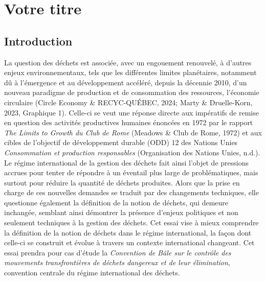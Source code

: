 \documentclass[12pt]{ulaval}
\date{Décembre 2024}
\begin{document}
  \maketitle

\frontmatter %
\pagestyle{plain} %
\setcounter{page}{2}



% 
  \hypersetup{linkcolor=black}
   \setcounter{tocdepth}{2}
  \tableofcontents

  \listoftables

  \listoffigures


% 
\mainmatter %
\pagestyle{fancyplain} %

\doublespace

\chapter{Votre titre}\label{votre-titre}

\section{Introduction}\label{introduction}

La question des déchets est associée, avec un engouement renouvelé, à d'autres enjeux environnementaux, tels que les différentes limites planétaires, notamment dû à l'émergence et au développement accéléré, depuis la décennie 2010, d'un nouveau paradigme de production et de consommation des ressources, l'économie circulaire (Circle Economy \& RECYC-QUÉBEC, 2024; Marty \& Druelle-Korn, 2023, Graphique 1). Celle-ci se veut une réponse directe aux impératifs de remise en question des activités productives humaines énoncées en 1972 par le rapport \emph{The Limits to Growth du Club de Rome} (Meadows \& Club de Rome, 1972) et aux cibles de l'objectif de développement durable (ODD) 12 des Nations Unies \emph{Consommation et production responsables} (Organisation des Nations Unies, n.d.). Le régime international de la gestion des déchets fait ainsi l'objet de pressions accrues pour tenter de répondre à un éventail plus large de problématiques, mais surtout pour réduire la quantité de déchets produites. Alors que la prise en charge de ces nouvelles demandes se traduit par des changements techniques, elle questionne également la définition de la notion de déchets, qui demeure inchangée, semblant ainsi démontrer la présence d'enjeux politiques et non seulement techniques à la gestion des déchets. Cet essai vise à mieux comprendre la définition de la notion de déchets dans le régime international, la façon dont celle-ci se construit et évolue à travers un contexte international changeant. Cet essai prendra pour cas d'étude la \emph{Convention de Bâle sur le contrôle des mouvements transfrontières de déchets dangereux et de leur élimination}, convention centrale du régime international des déchets.
\end{document}
